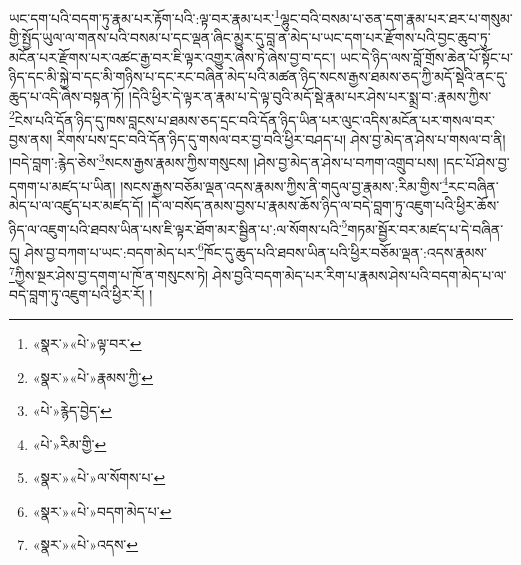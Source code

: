ཡང་དག་པའི་བདག་ཏུ་རྣམ་པར་རྟོག་པའི་:ལྟ་བར་རྣམ་པར་\footnote{«སྣར་»«པེ་»ལྟ་བར་}ལྷུང་བའི་བསམ་པ་ཅན་དག་རྣམ་པར་ཐར་པ་གསུམ་གྱི་སྤྱོད་ཡུལ་ལ་གནས་པའི་བསམ་པ་དང་ལྡན་ཞིང་མྱུར་དུ་བླ་ན་མེད་པ་ཡང་དག་པར་རྫོགས་པའི་བྱང་ཆུབ་ཏུ་མངོན་པར་རྫོགས་པར་འཚང་རྒྱ་བར་ཇི་ལྟར་འགྱུར་ཞེས་ཏེ་ཞེས་བྱ་བ་དང་། ཡང་དེ་ཉིད་ལས་བློ་གྲོས་ཆེན་པོ་སྟོང་པ་ཉིད་དང་མི་སྐྱེ་བ་དང་མི་གཉིས་པ་དང་རང་བཞིན་མེད་པའི་མཚན་ཉིད་སངས་རྒྱས་ཐམས་ཅད་ཀྱི་མདོ་སྡེའི་ནང་དུ་ཆུད་པ་འདི་ཞེས་བསྟན་ཏོ། །དེའི་ཕྱིར་དེ་ལྟར་ན་རྣམ་པ་དེ་ལྟ་བུའི་མདོ་སྡེ་རྣམ་པར་ཤེས་པར་སྨྲ་བ་:རྣམས་ཀྱིས་\footnote{«སྣར་»«པེ་»རྣམས་ཀྱི་}ངེས་པའི་དོན་ཉིད་དུ་ཁས་བླངས་པ་ཐམས་ཅད་དྲང་བའི་དོན་ཉིད་ཡིན་པར་ལུང་འདིས་མངོན་པར་གསལ་བར་བྱས་ནས། རིགས་པས་དྲང་བའི་དོན་ཉིད་དུ་གསལ་བར་བྱ་བའི་ཕྱིར་བཤད་པ། ཤེས་བྱ་མེད་ན་ཤེས་པ་གསལ་བ་ནི། །བདེ་བླག་:རྙེད་ཅེས་\footnote{«པེ་»རྙེད་བྱེད་}སངས་རྒྱས་རྣམས་ཀྱིས་གསུངས། །ཤེས་བྱ་མེད་ན་ཤེས་པ་བཀག་འགྲུབ་པས། །དང་པོ་ཤེས་བྱ་དགག་པ་མཛད་པ་ཡིན། །སངས་རྒྱས་བཅོམ་ལྡན་འདས་རྣམས་ཀྱིས་ནི་གདུལ་བྱ་རྣམས་:རིམ་གྱིས་\footnote{«པེ་»རིམ་གྱི་}རང་བཞིན་མེད་པ་ལ་འཛུད་པར་མཛད་དོ། །དེ་ལ་བསོད་ནམས་བྱས་པ་རྣམས་ཆོས་ཉིད་ལ་བདེ་བླག་ཏུ་འཇུག་པའི་ཕྱིར་ཆོས་ཉིད་ལ་འཇུག་པའི་ཐབས་ཡིན་པས་ཇི་ལྟར་ཐོག་མར་སྦྱིན་པ་:ལ་སོགས་པའི་\footnote{«སྣར་»«པེ་»ལ་སོགས་པ་}གཏམ་སྦྱོར་བར་མཛད་པ་དེ་བཞིན་དུ། ཤེས་བྱ་བཀག་པ་ཡང་:བདག་མེད་པར་\footnote{«སྣར་»«པེ་»བདག་མེད་པ་}ཁོང་དུ་ཆུད་པའི་ཐབས་ཡིན་པའི་ཕྱིར་བཅོམ་ལྡན་:འདས་རྣམས་\footnote{«སྣར་»«པེ་»འདས་}ཀྱིས་སྔར་ཤེས་བྱ་དགག་པ་ཁོ་ན་གསུངས་ཏེ། ཤེས་བྱའི་བདག་མེད་པར་རིག་པ་རྣམས་ཤེས་པའི་བདག་མེད་པ་ལ་བདེ་བླག་ཏུ་འཇུག་པའི་ཕྱིར་རོ། །
